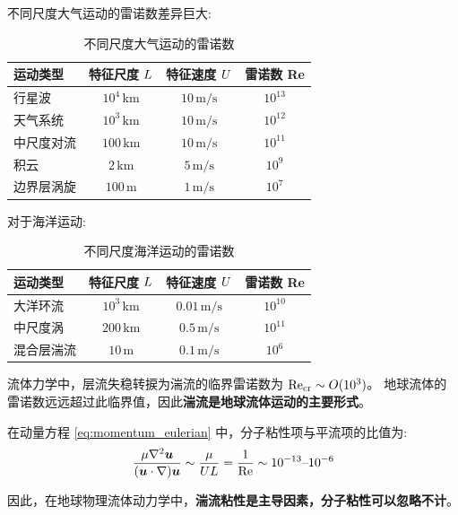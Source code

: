 不同尺度大气运动的雷诺数差异巨大:

\begin{table}[H]
    \centering
    \begin{tabular}{lccc}
    \toprule
    运动类型 & 特征尺度 $L$ & 特征速度 $U$ & 雷诺数 Re \\
    \midrule
    行星波 & $10^4\,\mathrm{km}$ & $10\,\mathrm{m/s}$ & $10^{13}$ \\
    天气系统 & $10^3\,\mathrm{km}$ & $10\,\mathrm{m/s}$ & $10^{12}$ \\
    中尺度对流 & $100\,\mathrm{km}$ & $10\,\mathrm{m/s}$ & $10^{11}$ \\
    积云 & $2\,\mathrm{km}$ & $5\,\mathrm{m/s}$ & $10^{9}$ \\
    边界层涡旋 & $100\,\mathrm{m}$ & $1\,\mathrm{m/s}$ & $10^{7}$ \\
    \bottomrule
    \end{tabular}
    \caption{不同尺度大气运动的雷诺数}
    \label{tab:reynolds_numbers}
\end{table}

对于海洋运动:
\begin{table}[H]
    \centering
    \begin{tabular}{lccc}
    \toprule
    运动类型 & 特征尺度 $L$ & 特征速度 $U$ & 雷诺数 Re \\
    \midrule
    大洋环流 & $10^3\,\mathrm{km}$ & $0.01\,\mathrm{m/s}$ & $10^{10}$ \\
    中尺度涡 & $200\,\mathrm{km}$ & $0.5\,\mathrm{m/s}$ & $10^{11}$ \\
    混合层湍流 & $10\,\mathrm{m}$ & $0.1\,\mathrm{m/s}$ & $10^{6}$ \\
    \bottomrule
    \end{tabular}
    \caption{不同尺度海洋运动的雷诺数}
    \label{tab:reynolds_numbers_ocean}
\end{table}

流体力学中，层流失稳转捩为湍流的临界雷诺数为 $\text{Re}_{\mathrm{cr}} \sim O(10^3)$。
地球流体的雷诺数远远超过此临界值，因此\textbf{湍流是地球流体运动的主要形式}。

在动量方程 \eqref{eq:momentum_eulerian} 中，分子粘性项与平流项的比值为:
\begin{equation*}
    \frac{\mu \nabla^2 \bm{u}}{(\bm{u} \cdot \nabla) \bm{u}} \sim \frac{\mu}{U L} = \frac{1}{\text{Re}} \sim 10^{-13} \text{--} 10^{-6}
\end{equation*}

因此，在地球物理流体动力学中，\textbf{湍流粘性是主导因素，分子粘性可以忽略不计}。

